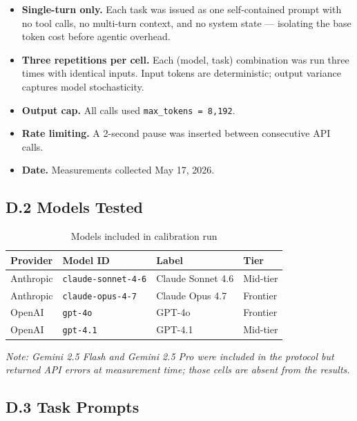 \documentclass{article}
\begin{document}
\begin{itemize}
  \item \textbf{Single-turn only.} Each task was issued as one self-contained prompt with
    no tool calls, no multi-turn context, and no system state — isolating the base token
    cost before agentic overhead.
  \item \textbf{Three repetitions per cell.} Each (model, task) combination was run three
    times with identical inputs. Input tokens are deterministic; output variance captures
    model stochasticity.
  \item \textbf{Output cap.} All calls used \texttt{max\_tokens = 8{,}192}.
  \item \textbf{Rate limiting.} A 2-second pause was inserted between consecutive API calls.
  \item \textbf{Date.} Measurements collected May 17, 2026.
\end{itemize}

\subsection*{D.2 Models Tested}

\begin{table}[ht]
\centering
\small
\caption{Models included in calibration run}
\label{tab:calib-models}
\begin{tabular}{@{}llll@{}}
\toprule
\textbf{Provider} & \textbf{Model ID} & \textbf{Label} & \textbf{Tier} \\
\midrule
Anthropic & \texttt{claude-sonnet-4-6} & Claude Sonnet 4.6 & Mid-tier \\
Anthropic & \texttt{claude-opus-4-7}   & Claude Opus 4.7   & Frontier \\
OpenAI    & \texttt{gpt-4o}            & GPT-4o            & Frontier \\
OpenAI    & \texttt{gpt-4.1}           & GPT-4.1           & Mid-tier \\
\bottomrule
\end{tabular}
\end{table}

\noindent\textit{Note: Gemini 2.5 Flash and Gemini 2.5 Pro were included in the protocol
but returned API errors at measurement time; those cells are absent from the results.}

\subsection*{D.3 Task Prompts}
\end{document}
